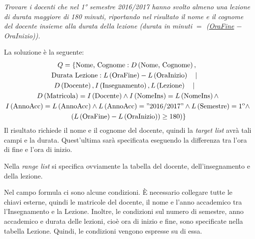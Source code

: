 \documentclass[a4paper]{article}
\begin{document}
	\noindent
	\emph{Trovare i docenti che nel 1° semestre 2016/2017 hanno svolto almeno una lezione di durata maggiore di 180 minuti, riportando nel risultato il nome e il cognome del docente insieme alla durata della lezione (durata in minuti $=$ (\underline{OraFine} $-$ OraInizio)).}\newline
	
	\noindent
	La soluzione è la seguente:
	\begin{gather*}
		Q = \left\{
		\text{Nome, Cognome}: D\left(\text{Nome, Cognome}\right), \right. \\
		\text{Durata Lezione}: L\left(\text{OraFine}\right) - L\left(\text{OraInizio}\right) \hspace{1em} | \hspace{1em} \\
		D\left(\text{Docente}\right), I\left(\text{Insegnamento}\right), L\left(\text{Lezione}\right) \hspace{1em} | \hspace{1em} \\
		D\left(\text{Matricola}\right) = I\left(\text{Docente}\right) \land I\left(\text{NomeIns}\right) = L\left(\text{NomeIns}\right) \land \\
		I\left(\text{AnnoAcc}\right) = L\left(\text{AnnoAcc}\right) \land L\left(\text{AnnoAcc}\right) = "2016/2017" \land L\left(\text{Semestre}\right) = 1^{\mathrm{o}} \land \\
		\left. \left. \left(L\left(\text{OraFine}\right) - L\left(\text{OraInizio}\right)\right) \ge 180
		\right)\right\}
	\end{gather*}
	Il risultato richiede il nome e il cognome del docente, quindi la \emph{target list} avrà tali campi e la durata. Quest'ultima sarà specificata eseguendo la differenza tra l'ora di fine e l'ora di inizio.\newline
	
	\noindent
	Nella \emph{range list} si specifica ovviamente la tabella del docente, dell'insegnamento e della lezione.\newline
	
	\noindent
	Nel campo formula ci sono alcune condizioni. È necessario collegare tutte le chiavi esterne, quindi le matricole del docente, il nome e l'anno accademico tra l'Insegnamento e la Lezione. Inoltre, le condizioni sul numero di semestre, anno accademico e durata delle lezioni, cioè ora di inizio e fine, sono specificate nella tabella Lezione. Quindi, le condizioni vengono espresse su di essa.\newpage
	
\end{document}
